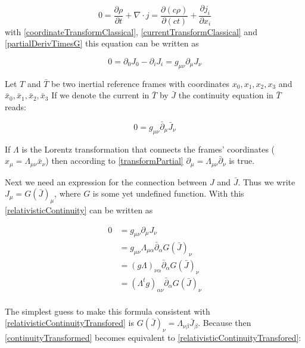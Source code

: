 \documentclass{article}
\begin{document}
\begin{equation}
    0 = \frac{\partial \rho}{\partial t} + \nabla \cdot j = \frac{\partial (c \rho)}{\partial (ct)} + \frac{\partial j_i}{\partial x_i}
\end{equation}
with \ref{coordinateTransformClassical}, \ref{currentTransformClassical} and \ref{partialDerivTimesG} this equation can be written as

\begin{equation} \label{relativisticContinuity}
    0 = \partial_0 J_0 - \partial_i J_i = g_{\mu\nu} \partial_\mu J_{\nu}
\end{equation}


Let $T$ and $\bar{T}$ be two inertial reference frames with coordinates $x_0, x_1, x_2, x_3$ and $\bar{x}_0, \bar{x}_1, \bar{x}_2, \bar{x}_3$
If we denote the current in $\bar{T}$ by $\bar{J}$ the continuity equation in $\bar{T}$ reads:

\begin{equation} \label{relativisticContinuityTransfored}
    0 = g_{\mu\nu} \bar{\partial}_\mu \bar{J}_{\nu}
\end{equation}

If $\Lambda$ is the Lorentz transformation that connects the frames' coordinates ($x_\mu = \Lambda_{\mu\nu} \bar{x}_\nu$) then according to \ref{transformPartial}
$\partial_\mu = \Lambda_{\mu\nu} \bar{\partial}_\nu$ is true.

Next we need an expression for the connection between $J$ and $\bar{J}$.
Thus we write $J_\mu=G(\bar{J})_\mu$, where $G$ is some yet undefined function.
With this \ref{relativisticContinuity} can be written as

\begin{align} \label{continuityTransformed}
0 & =  g_{\mu\nu} \partial_\mu J_{\nu} \nonumber \\
  & = g_{\mu\nu} \Lambda_{\mu\alpha} \bar{\partial}_\alpha  G(\bar{J})_\nu \nonumber \\
  & = (g \Lambda)_{\nu\alpha} \bar{\partial}_\alpha  G(\bar{J})_\nu \nonumber \\
  & = (\Lambda^t g )_{\alpha\nu} \bar{\partial}_\alpha  G(\bar{J})_\nu \nonumber \\
\end{align}

The simplest guess to make this formula consistent with \ref{relativisticContinuityTransfored} is $G(\bar{J})_\nu = \Lambda_{\nu\beta} \bar{J}_\beta$.
Because then \ref{continuityTransformed} becomes equivalent to \ref{relativisticContinuityTransfored}:
\end{document}
